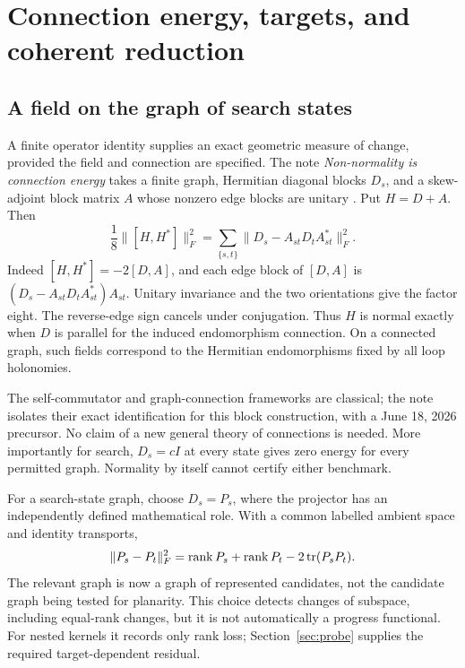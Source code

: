 \documentclass[11pt,letterpaper]{article}
\theoremstyle{definition}
\theoremstyle{remark}\newtheorem{remark}[theorem]{Remark}
\begin{document}
\section{Connection energy, targets, and coherent reduction}\label{sec:connection}
\subsection{A field on the graph of search states}
A finite operator identity supplies an exact geometric measure of change, provided the field and connection are specified. The note \emph{Non-normality is connection energy} takes a finite graph, Hermitian diagonal blocks $D_s$, and a skew-adjoint block matrix $A$ whose nonzero edge blocks are unitary \cite{BeasleyConnection}. Put $H=D+A$. Then
\begin{equation}\label{eq:connectionenergy}
\frac18\|[H,H^*]\|_F^2
=\sum_{\{s,t\}}\|D_s-A_{st}D_tA_{st}^*\|_F^2.
\end{equation}
Indeed $[H,H^*]=-2[D,A]$, and each edge block of $[D,A]$ is $(D_s-A_{st}D_tA_{st}^*)A_{st}$. Unitary invariance and the two orientations give the factor eight. The reverse-edge sign cancels under conjugation. Thus $H$ is normal exactly when $D$ is parallel for the induced endomorphism connection. On a connected graph, such fields correspond to the Hermitian endomorphisms fixed by all loop holonomies.

The self-commutator and graph-connection frameworks are classical; the note isolates their exact identification for this block construction, with a June 18, 2026 precursor. No claim of a new general theory of connections is needed. More importantly for search, $D_s=cI$ at every state gives zero energy for every permitted graph. Normality by itself cannot certify either benchmark.

For a search-state graph, choose $D_s=P_s$, where the projector has an independently defined mathematical role. With a common labelled ambient space and identity transports,
\begin{equation}\label{eq:projectorenergy}
\|P_s-P_t\|_F^2=\operatorname{rank} P_s+\operatorname{rank} P_t-2\operatorname{tr}(P_sP_t).
\end{equation}
The relevant graph is now a graph of represented candidates, not the candidate graph being tested for planarity. This choice detects changes of subspace, including equal-rank changes, but it is not automatically a progress functional. For nested kernels it records only rank loss; Section~\ref{sec:probe} supplies the required target-dependent residual.
\end{document}
